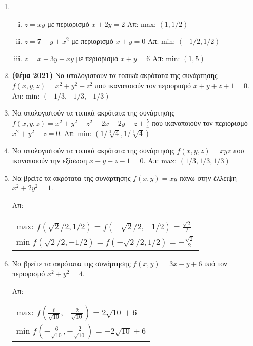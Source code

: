 \begin{enumerate}

  \item 
    \begin{enumerate}[i)]
      \item $ z=xy $ με περιορισμό $ x+2y=2 $ \hfill Απ: max: $ (1,1/2) $ 
      \item $ z=7-y+x^{2} $ με περιορισμό $ x+y=0 $ \hfill Απ: min: $ (-1/2,1/2) $ 
      \item $ z=x-3y-xy $ με περιορισμό $ x+y=6 $ \hfill Απ: min: $ (1,5) $ 
    \end{enumerate}

  \item \textbf{(θέμα 2021)} 
    Να υπολογιστούν τα τοπικά ακρότατα της συνάρτησης $ f(x,y,z) = x^{2}+y^{2}+z^{2}
    $ που ικανοποιούν τον περιορισμό $ x+y+z+1=0 $.
    \hfill Απ: min: $ (-1/3,-1/3,-1/3) $ 

  \item Να υπολογιστούν τα τοπικά ακρότατα της συνάρτησης 
    $ f(x,y,z) = x^{2}+y^{2}+z^{2}-2x-2y-z+ \frac{5}{4} $ που ικανοποιούν τον 
    περιορισμό $ x^{2}+y^{2}-z=0  $.
    \hfill Απ: min: $ (1/ \sqrt[3]{4} , 1/ \sqrt[3]{4}) $ 

  \item Να υπολογιστούν τα τοπικά ακρότατα της συνάρτησης 
    $f(x,y,z)=xyz$ που ικανοποιούν την εξίσωση $x+y+z-1=0$.  
    \hfill Απ: max: $ (1/3,1/3,1/3) $ 

  \item Να βρείτε τα ακρότατα της συνάρτησης $ f(x,y) = xy $ πάνω στην έλλειψη 
    $ x^{2}+2y^{2}=1 $.

    \hfill Απ: 
    \begin{tabular}{l}
      max: $ f(\sqrt{2} /2, 1/2) = f(- \sqrt{2} /2, -1/2) = \frac{\sqrt{2}}{2} $ \\
      min $ f(\sqrt{2} /2, -1/2) = f(- \sqrt{2} /2, 1/2) = -\frac{\sqrt{2}}{2} $ \\
    \end{tabular}

  \item Να βρείτε τα ακρότατα της συνάρτησης $ f(x,y) = 3x-y+6 $ υπό τον περιορισμό 
    $ x^{2}+y^{2}=4 $.

    \hfill Απ:  
    \begin{tabular}{l}
      max: $ f(\frac{6}{\sqrt{10}} , - \frac{2}{\sqrt{10}}) = 2 \sqrt{10} +6 $ \\
      min $ f(-\frac{6}{\sqrt{10}} , + \frac{2}{\sqrt{10}}) = -2 \sqrt{10} +6 $ \\
    \end{tabular}
\end{enumerate}




